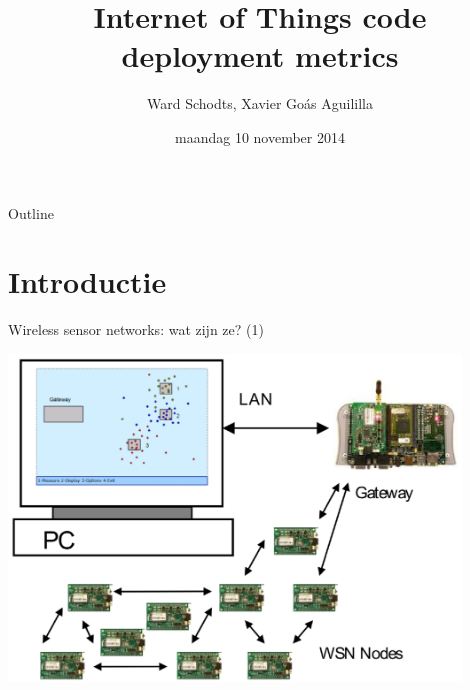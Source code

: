 \documentclass[presentation, bigger]{beamer}
\author{Ward Schodts, Xavier Goás Aguililla}
\date{maandag 10 november 2014}
\title{Internet of Things code deployment metrics}
\begin{document}
\maketitle
\begin{frame}[noframenumbering]{Outline}
\tableofcontents
\end{frame}



\section{Introductie}
\label{sec-1}
\begin{frame}[label=sec-1-1]{Wireless sensor networks: wat zijn ze? (1)}

\includegraphics[width=0.9\textwidth,keepaspectration=true]{intro/overview.png}

\end{frame}
\end{document}
